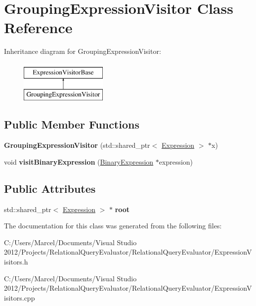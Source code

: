 \hypertarget{class_grouping_expression_visitor}{\section{Grouping\+Expression\+Visitor Class Reference}
\label{class_grouping_expression_visitor}
}
Inheritance diagram for Grouping\+Expression\+Visitor\+:\begin{figure}[H]
\begin{center}
\leavevmode
\includegraphics[height=2.000000cm]{class_grouping_expression_visitor}
\end{center}
\end{figure}
\subsection*{Public Member Functions}
\begin{DoxyCompactItemize}
\item 
\hypertarget{class_grouping_expression_visitor_a237e5aaa25294095a1b3c14c4ef64794}{{\bfseries Grouping\+Expression\+Visitor} (std\+::shared\+\_\+ptr$<$ \hyperlink{class_expression}{Expression} $>$ $\ast$x)}\label{class_grouping_expression_visitor_a237e5aaa25294095a1b3c14c4ef64794}

\item 
\hypertarget{class_grouping_expression_visitor_aba30832e7f966be15e50b17d68badbb1}{void {\bfseries visit\+Binary\+Expression} (\hyperlink{class_binary_expression}{Binary\+Expression} $\ast$expression)}\label{class_grouping_expression_visitor_aba30832e7f966be15e50b17d68badbb1}

\end{DoxyCompactItemize}
\subsection*{Public Attributes}
\begin{DoxyCompactItemize}
\item 
\hypertarget{class_grouping_expression_visitor_a493ef343ca18357dca158d83085b5ab4}{std\+::shared\+\_\+ptr$<$ \hyperlink{class_expression}{Expression} $>$ $\ast$ {\bfseries root}}\label{class_grouping_expression_visitor_a493ef343ca18357dca158d83085b5ab4}

\end{DoxyCompactItemize}


The documentation for this class was generated from the following files\+:\begin{DoxyCompactItemize}
\item 
C\+:/\+Users/\+Marcel/\+Documents/\+Visual Studio 2012/\+Projects/\+Relational\+Query\+Evaluator/\+Relational\+Query\+Evaluator/Expression\+Visitors.\+h\item 
C\+:/\+Users/\+Marcel/\+Documents/\+Visual Studio 2012/\+Projects/\+Relational\+Query\+Evaluator/\+Relational\+Query\+Evaluator/Expression\+Visitors.\+cpp\end{DoxyCompactItemize}

